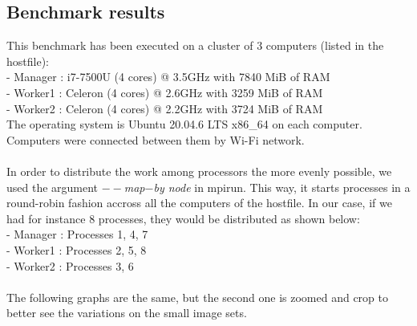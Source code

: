 \subsection{Benchmark results}
This benchmark has been executed on a cluster of 3 computers (listed in the hostfile):\\
 - Manager : i7-7500U (4 cores) @ 3.5GHz with 7840 MiB of RAM\\
 - Worker1 : Celeron (4 cores) @ 2.6GHz with 3259 MiB of RAM\\
 - Worker2 : Celeron (4 cores) @ 2.2GHz with 3724 MiB of RAM\\
The operating system is Ubuntu 20.04.6 LTS x86\_64 on each computer. Computers were connected between them by Wi-Fi network.\\
\\
In order to distribute the work among processors the more evenly possible, we used the argument \emph{$--$map$-$by node} in mpirun. This way, it starts processes in a round-robin fashion accross all the computers of the hostfile. In our case, if we had for instance 8 processes, they would be distributed as shown below:\\
- Manager : Processes 1, 4, 7\\
- Worker1 : Processes 2, 5, 8\\
- Worker2 : Processes 3, 6\\
\\
The following graphs are the same, but the second one is zoomed and crop to better see the variations on the small image sets.
